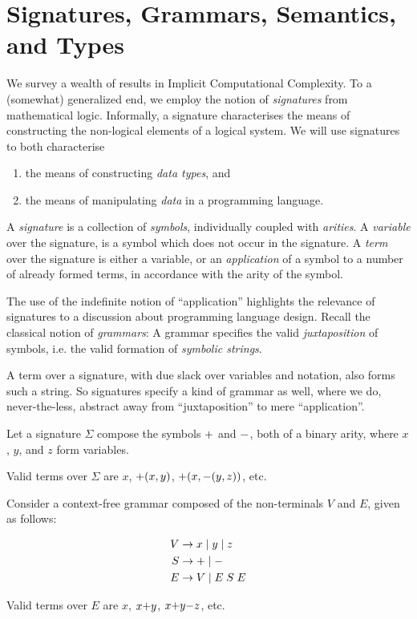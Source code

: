 \section{Signatures, Grammars, Semantics, and Types}

We survey a wealth of results in Implicit Computational Complexity.  To a
(somewhat) generalized end, we employ the notion of \emph{signatures} from
mathematical logic. Informally, a signature characterises the means of
constructing the non-logical elements of a logical system. We will use
signatures to both characterise

\begin{enumerate}[label=(\arabic*)]

\item the means of constructing \emph{data types}, and

\item the means of manipulating \emph{data} in a programming language.

\end{enumerate}

A \emph{signature} is a collection of \emph{symbols}, individually coupled with
\emph{arities}. A \emph{variable} over the signature, is a symbol which does
not occur in the signature. A \emph{term} over the signature is either a
variable, or an \emph{application} of a symbol to a number of already formed
terms, in accordance with the arity of the symbol.

The use of the indefinite notion of ``application'' highlights the relevance of
signatures to a discussion about programming language design. Recall the
classical notion of \emph{grammars}: A grammar specifies the valid
\emph{juxtaposition} of symbols, i.e. the valid formation of \emph{symbolic
strings}.

A term over a signature, with due slack over variables and notation, also forms
such a string. So signatures specify a kind of grammar as well, where we do,
never-the-less, abstract away from ``juxtaposition'' to mere ``application''.

\begin{example} \label{ex:first-signature} Let a signature $\Sigma$ compose the
symbols $\mathtt{+}$ and $\mathtt{-}$, both of a binary arity, where $x$, $y$, and
$z$ form variables.

Valid terms over $\Sigma$ are $x$, $\mathtt{+}{\mathopen{}\left({x,y}\right)\mathclose{}}$,
$\mathtt{+}{\mathopen{}\left({x,\mathtt{-}{\mathopen{}\left({y,z}\right)\mathclose{}}}\right)\mathclose{}}$, etc.  \end{example}

\begin{example} \label{ex:first-grammar} Consider a context-free grammar
composed of the non-terminals $V$ and $E$, given as follows:

\begin{align*}
V &\rightarrow x \mid y \mid z \\
S &\rightarrow \mathtt{+} \mid \mathtt{-} \\
E &\rightarrow V \mid E \; S \; E
\end{align*}

Valid terms over $E$ are $x$, $x \mathtt{+} y$, $x \mathtt{+} y \mathtt{-} z$,
etc. \end{example}

